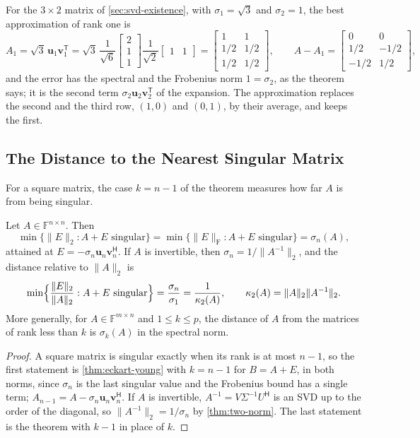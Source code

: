 For the $3\times2$ matrix of \cref{sec:svd-existence}, with $\sigma_1=\sqrt3$ and $\sigma_2=1$, the best approximation of rank one is
\[
A_1=\sqrt3\,\mathbf u_1\mathbf v_1^{\mathsf T}=\sqrt3\,\frac1{\sqrt6}\begin{bmatrix}2\\1\\1\end{bmatrix}\frac1{\sqrt2}\begin{bmatrix}1&1\end{bmatrix}=\begin{bmatrix}1&1\\1/2&1/2\\1/2&1/2\end{bmatrix},\qquad A-A_1=\begin{bmatrix}0&0\\1/2&-1/2\\-1/2&1/2\end{bmatrix},
\]
and the error has the spectral and the Frobenius norm $1=\sigma_2$, as the theorem says; it is the second term $\sigma_2\mathbf u_2\mathbf v_2^{\mathsf T}$ of the expansion. The approximation replaces the second and the third row, $(1,0)$ and $(0,1)$, by their average, and keeps the first.

\subsection{The Distance to the Nearest Singular Matrix}

For a square matrix, the case $k=n-1$ of the theorem measures how far $A$ is from being singular.

\begin{corollary}
\label{cor:distance-singular}
Let $A\in\mathbb F^{n\times n}$. Then
\[
\min\{\|E\|_2:A+E\text{ singular}\}=\min\{\|E\|_{\mathrm F}:A+E\text{ singular}\}=\sigma_n(A),
\]
attained at $E=-\sigma_n\mathbf u_n\mathbf v_n^{\mathsf H}$. If $A$ is invertible, then $\sigma_n=1/\|A^{-1}\|_2$, and the distance relative to $\|A\|_2$ is
\[
\min\Bigl\{\frac{\|E\|_2}{\|A\|_2}:A+E\text{ singular}\Bigr\}=\frac{\sigma_n}{\sigma_1}=\frac1{\kappa_2(A)},\qquad\kappa_2(A)=\|A\|_2\|A^{-1}\|_2 .
\]
More generally, for $A\in\mathbb F^{m\times n}$ and $1\le k\le p$, the distance of $A$ from the matrices of rank less than $k$ is $\sigma_k(A)$ in the spectral norm.
\end{corollary}

\begin{proof}
A square matrix is singular exactly when its rank is at most $n-1$, so the first statement is \cref{thm:eckart-young} with $k=n-1$ for $B=A+E$, in both norms, since $\sigma_n$ is the last singular value and the Frobenius bound has a single term; $A_{n-1}=A-\sigma_n\mathbf u_n\mathbf v_n^{\mathsf H}$. If $A$ is invertible, $A^{-1}=V\Sigma^{-1}U^{\mathsf H}$ is an SVD up to the order of the diagonal, so $\|A^{-1}\|_2=1/\sigma_n$ by \cref{thm:two-norm}. The last statement is the theorem with $k-1$ in place of $k$.
\end{proof}

